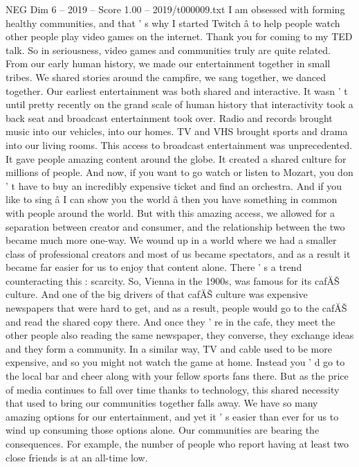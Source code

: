 \begin{textsample}{NEG Dim 6 – 2019 – Score 1.00 – 2019/t000009.txt}  \label{ex:f6_neg_014}
I am obsessed with forming healthy communities, and that ' s why I started Twitch â to help people watch other people play video games on the internet.
Thank you for coming to my TED talk.
So in seriousness, video games and communities truly are quite related.
From our early human history, we made our entertainment together in small tribes.
We shared stories around the campfire, we sang together, we danced together.
Our earliest entertainment was both shared and interactive.
It wasn ' t until pretty recently on the grand scale of human history that interactivity took a back seat and broadcast entertainment took over.
Radio and records brought music into our vehicles, into our homes.
TV and VHS brought sports and drama into our living rooms.
This access to broadcast entertainment was unprecedented.
It gave people amazing content around the globe.
It created a shared culture for millions of people.
And now, if you want to go watch or listen to Mozart, you don ' t have to buy an incredibly expensive ticket and find an orchestra.
And if you like to sing â I can show you the world â then you have something in common with people around the world.
But with this amazing access, we allowed for a separation between creator and consumer, and the relationship between the two became much more one-way.
We wound up in a world where we had a smaller class of professional creators and most of us became spectators, and as a result it became far easier for us to enjoy that content alone.
There ' s a trend counteracting this : scarcity.
So, Vienna in the 1900s, was famous for its cafĂŠ culture.
And one of the big drivers of that cafĂŠ culture was expensive newspapers that were hard to get, and as a result, people would go to the cafĂŠ and read the shared copy there.
And once they ' re in the cafe, they meet the other people also reading the same newspaper, they converse, they exchange ideas and they form a community.
In a similar way, TV and cable used to be more expensive, and so you might not watch the game at home.
Instead you ' d go to the local bar and cheer along with your fellow sports fans there.
But as the price of media continues to fall over time thanks to technology, this shared necessity that used to bring our communities together falls away.
We have so many amazing options for our entertainment, and yet it ' s easier than ever for us to wind up consuming those options alone.
Our communities are bearing the consequences.
For example, the number of people who report having at least two close friends is at an all-time low.

\end{textsample}
